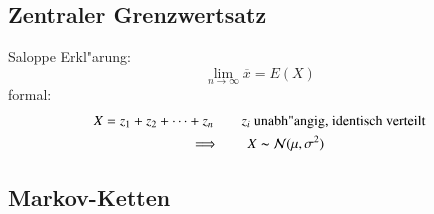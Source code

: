 \subsection{Zentraler Grenzwertsatz}
Saloppe Erkl"arung:
\begin{equation}
	\lim_{n\to\infty}\overline{x} = E(X)
\end{equation}
formal:
\begin{gather}
	X = z_1 + z_2 + \cdots + z_n\qquad z_i\text{ unabh"angig, identisch verteilt} \notag \\
	\Longrightarrow\qquad X\thicksim\mathcal{N}(\mu,\sigma^2)
\end{gather}

\subsection{Markov-Ketten}
